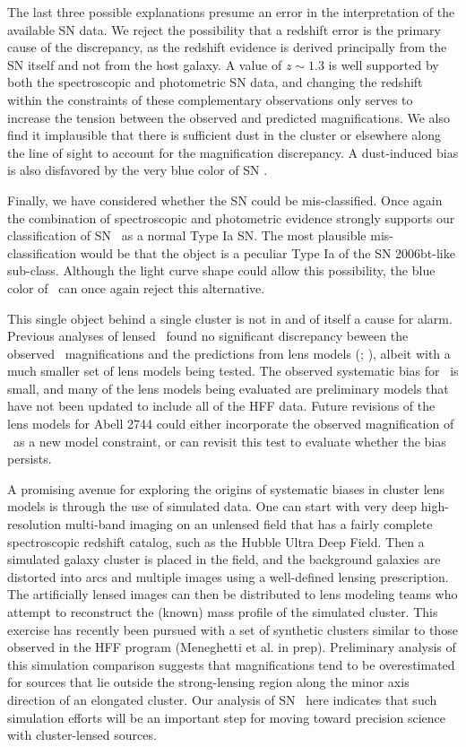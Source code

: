 The last three possible explanations presume an error in the
interpretation of the available SN data.  We reject the possibility
that a redshift error is the primary cause of the discrepancy, as the
redshift evidence is derived principally from the SN itself and not
from the host galaxy. A value of $z\sim1.3$ is well supported by both
the spectroscopic and photometric SN data, and changing the redshift
within the constraints of these complementary observations only serves
to increase the tension between the observed and predicted
magnifications.  We also find it implausible that there is sufficient
dust in the cluster or elsewhere along the line of sight to account
for the magnification discrepancy.  A dust-induced bias is also
disfavored by the very blue color of SN \tomas.  

Finally, we have considered whether the SN could be
mis-classified. Once again the combination of spectroscopic and
photometric evidence strongly supports our classification of
SN \tomas\ as a normal Type Ia SN.  The most plausible
mis-classification would be that the object is a peculiar Type Ia of
the SN 2006bt-like sub-class.  Although the light curve shape could
allow this possibility, the blue color of \tomas\ can once again
reject this alternative. 


This single object behind a single cluster is not in and of itself a
cause for alarm.  Previous analyses of lensed \SNIa\ found no
significant discrepancy beween the observed \SNIa\ magnifications and
the predictions from lens models
(; \citealt{Nordin:2014}), albeit with a much
smaller set of lens models being tested.  The observed systematic bias
for \tomas\ is small, and many of the lens models being evaluated are
preliminary models that have not been updated to include all of the
HFF data.  Future revisions of the lens models for Abell
2744 could either incorporate the observed magnification
of \tomas\ as a new model constraint, or can revisit this test to
evaluate whether the bias persists.

A promising avenue for exploring the origins of systematic biases in
cluster lens models is through the use of simulated data.  One can
start with very deep high-resolution multi-band imaging on an unlensed
field that has a fairly complete spectroscopic redshift catalog, such
as the Hubble Ultra Deep Field.  Then a simulated galaxy cluster is
placed in the field, and the background galaxies are distorted into
arcs and multiple images using a well-defined lensing prescription.
The artificially lensed images can then be distributed to lens
modeling teams who attempt to reconstruct the (known) mass profile of
the simulated cluster.  This exercise has recently been pursued with a
set of synthetic clusters similar to those observed in the HFF program
(Meneghetti et al. in prep).  Preliminary analysis of this simulation
comparison suggests that magnifications tend to be
overestimated for sources that lie outside the strong-lensing region
along the minor axis direction of an elongated cluster.  Our analysis
of SN \tomas\ here indicates that such simulation efforts will be an
important step for moving toward precision science with cluster-lensed
sources. 

